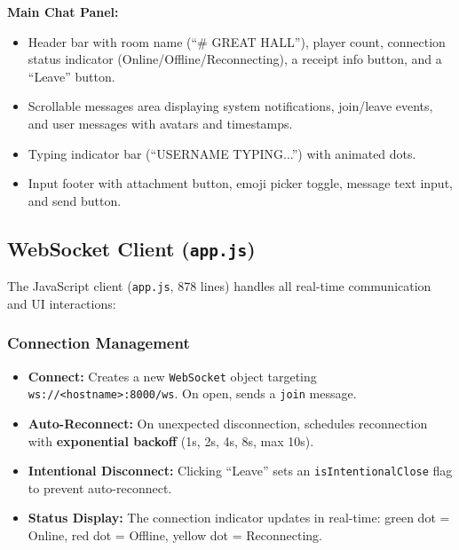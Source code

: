 \documentclass[12pt, a4paper]{article}
\begin{document}
\textbf{Main Chat Panel:}
\begin{itemize}[leftmargin=*]
    \item Header bar with room name (``\# GREAT HALL''), player count, connection status indicator (Online/Offline/Reconnecting), a receipt info button, and a ``Leave'' button.
    \item Scrollable messages area displaying system notifications, join/leave events, and user messages with avatars and timestamps.
    \item Typing indicator bar (``USERNAME TYPING...'') with animated dots.
    \item Input footer with attachment button, emoji picker toggle, message text input, and send button.
\end{itemize}

\subsection{WebSocket Client (\texttt{app.js})}

The JavaScript client (\texttt{app.js}, 878 lines) handles all real-time communication and UI interactions:

\subsubsection{Connection Management}
\begin{itemize}[leftmargin=*]
    \item \textbf{Connect:} Creates a new \texttt{WebSocket} object targeting \texttt{ws://<hostname>:8000/ws}. On open, sends a \texttt{join} message.
    \item \textbf{Auto-Reconnect:} On unexpected disconnection, schedules reconnection with \textbf{exponential backoff} (1s, 2s, 4s, 8s, max 10s).
    \item \textbf{Intentional Disconnect:} Clicking ``Leave'' sets an \texttt{isIntentionalClose} flag to prevent auto-reconnect.
    \item \textbf{Status Display:} The connection indicator updates in real-time: green dot = Online, red dot = Offline, yellow dot = Reconnecting.
\end{itemize}
\end{document}

